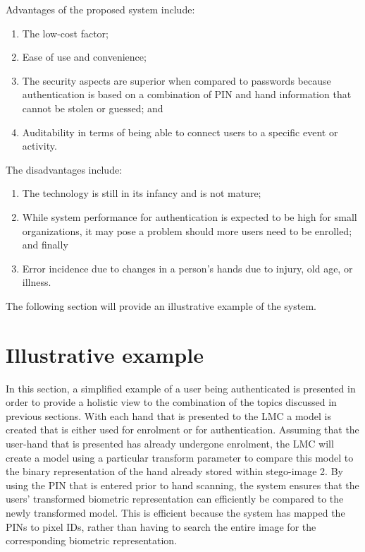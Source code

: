 Advantages of the proposed system include:
    \begin{enumerate}[label=\roman*.]
        \item The low-cost factor; 
        \item Ease of use and convenience;
        \item The security aspects are superior when compared to passwords because authentication is based on a combination of PIN and hand information that cannot be stolen or guessed; and
        \item Auditability in terms of being able to connect users to a specific event or activity.
    \end{enumerate}
	
The disadvantages include: 
    \begin{enumerate}[label=\roman*.]
        \item The technology is still in its infancy and is not mature;
        \item While system performance for authentication is expected to be high for small organizations, it may pose a problem should more users need to be enrolled; and finally
        \item Error incidence due to changes in a person’s hands due to injury, old age, or illness.
    \end{enumerate}

The following section will provide an illustrative example of the system.

\section{Illustrative example}

In this section, a simplified example of a user being authenticated is presented in order to provide a holistic view to the combination of the topics discussed in previous sections.
With each hand that is presented to the LMC a model is created that is either used for enrolment or for authentication. Assuming that the user-hand that is presented has already undergone enrolment, the LMC will create a model using a particular transform parameter to compare this model to the binary representation of the hand already stored within stego-image 2. By using the PIN that is entered prior to hand scanning, the system ensures that the users’ transformed biometric representation can efficiently be compared to the newly transformed model. This is efficient because the system has mapped the PINs to pixel IDs, rather than having to search the entire image for the corresponding biometric representation.

